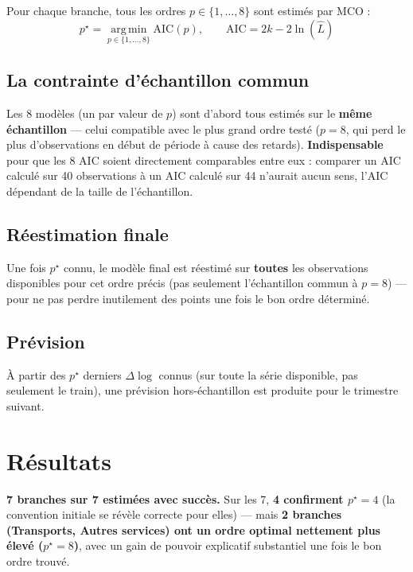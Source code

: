 \documentclass[11pt,a4paper]{article}
\begin{document}
Pour chaque branche, tous les ordres $p\in\{1,\dots,8\}$ sont estimés par MCO :
\begin{equation}
p^\star = \operatorname*{arg\,min}_{p\in\{1,\dots,8\}} \text{AIC}(p), \qquad \text{AIC} = 2k - 2\ln(\hat{L})
\label{eq:aic_ar}
\end{equation}

\subsection{La contrainte d'échantillon commun}

\begin{definitionbox}
Les 8 modèles (un par valeur de $p$) sont d'abord tous estimés sur le \textbf{même échantillon} --- celui compatible avec le plus grand ordre testé ($p=8$, qui perd le plus d'observations en début de période à cause des retards). \textbf{Indispensable} pour que les 8 AIC soient directement comparables entre eux : comparer un AIC calculé sur 40 observations à un AIC calculé sur 44 n'aurait aucun sens, l'AIC dépendant de la taille de l'échantillon.
\end{definitionbox}

\subsection{Réestimation finale}

Une fois $p^\star$ connu, le modèle final est réestimé sur \textbf{toutes} les observations disponibles pour cet ordre précis (pas seulement l'échantillon commun à $p=8$) --- pour ne pas perdre inutilement des points une fois le bon ordre déterminé.

\subsection{Prévision}

À partir des $p^\star$ derniers $\Delta\log$ connus (sur toute la série disponible, pas seulement le train), une prévision hors-échantillon est produite pour le trimestre suivant.

\section{Résultats}

\begin{resultatbox}
\textbf{7 branches sur 7 estimées avec succès.} Sur les 7, \textbf{4 confirment $p^\star=4$} (la convention initiale se révèle correcte pour elles) --- mais \textbf{2 branches (Transports, Autres services) ont un ordre optimal nettement plus élevé ($p^\star=8$)}, avec un gain de pouvoir explicatif substantiel une fois le bon ordre trouvé.
\end{resultatbox}
\end{document}
